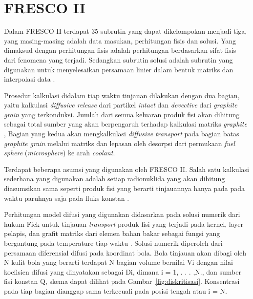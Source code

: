 \documentclass[a4paper,11pt]{report}
\renewcommand{\figurename}{Gambar}
\begin{document}
\section{FRESCO II}
Dalam FRESCO-II terdapat 35 subrutin yang dapat dikelompokan menjadi tiga, yang masing-masing adalah data masukan, perhitungan fisis dan solusi. Yang dimaksud dengan perhitungan fisis adalah perhitungan berdasarkan sifat fisis dari fenomena yang terjadi. Sedangkan subrutin solusi adalah subrutin yang digunakan untuk menyelesaikan persamaan linier dalam bentuk matriks dan interpolasi data \cite{report3}.

Prosedur kalkulasi didalam tiap waktu tinjauan dilakukan dengan dua bagian, yaitu kalkulasi \textit{diffusive release} dari partikel \textit{intact} dan \textit{devective} dari \textit{graphite grain} yang terkonduksi. Jumlah dari semua keluaran produk fisi akan dihitung sebagai total sumber yang akan berpengaruh terhadap kalkulasi matriks \textit{graphite} \cite{report2}, Bagian yang kedua akan mengkalkulasi \textit{diffusive transport} pada bagian batas \textit{graphite grain} melalui matriks dan lepasan oleh desorpsi dari permukaan \textit{fuel sphere} (\textit{microsphere}) ke arah \textit{coolant}.

Terdapat beberapa asumsi yang digunakan oleh FRESCO II. Salah satu kalkulasi sederhana yang digunakan adalah setiap radionuklida yang akan dihitung diasumsikan sama seperti produk fisi yang berarti tinjauannya hanya pada pada waktu paruhnya saja pada fluks konstan \cite{report3}.

Perhitungan model difusi yang digunakan didasarkan pada solusi numerik dari hukum Fick untuk tinjauan \textit{transport} produk fisi yang terjadi pada kernel, layer pelapis, dan grafit matriks dari elemen bahan bakar sebagai fungsi yang bergantung pada temperature tiap waktu \cite{report2}. Solusi numerik diperoleh dari persamaan diferensial difusi pada koordinat bola. Bola tinjauan akan dibagi oleh N kulit bola yang berarti terdapat N bagian volume bernilai Vi dengan nilai koefisien difusi yang dinyatakan sebagai Di, dimana i = 1, . . . ,N., dan sumber fisi konstan Q, skema dapat dilihat pada \figurename~\ref{fig:diskritisasi}. Konsentrasi pada tiap bagian dianggap sama terkecuali pada posisi tengah atau i = N. 
\end{document}

